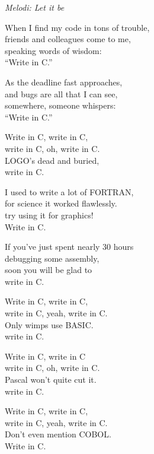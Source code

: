 {\footnotesize\textit{Melodi: Let it be}}\par
\vspace{10pt}
When I find my code in tons of trouble,\\
friends and colleagues come to me,\\
speaking words of wisdom:\\
``Write in C.''\par
\vspace{10pt}
As the deadline fast approaches,\\
and bugs are all that I can see,\\
somewhere, someone whispers:\\
``Write in C.''\par
\vspace{10pt}
Write in C, write in C,\\
write in C, oh, write in C.\\
LOGO's dead and buried,\\
write in C.\par
\vspace{10pt}
I used to write a lot of FORTRAN,\\
for science it worked flawlessly.\\
try using it for graphics!\\
Write in C.\par
\vspace{10pt}
If you've just spent nearly 30 hours\\
debugging some assembly,\\
soon you will be glad to\\
write in C.\par
\newpage
Write in C, write in C,\\
write in C, yeah, write in C.\\
Only wimps use BASIC.\\
write in C.\par
\vspace{10pt}
Write in C, write in C \\
write in C, oh, write in C.\\
Pascal won't quite cut it.\\
write in C.\par
\vspace{10pt}
Write in C, write in C,\\
write in C, yeah, write in C.\\
Don't even mention COBOL.\\
Write in C.
